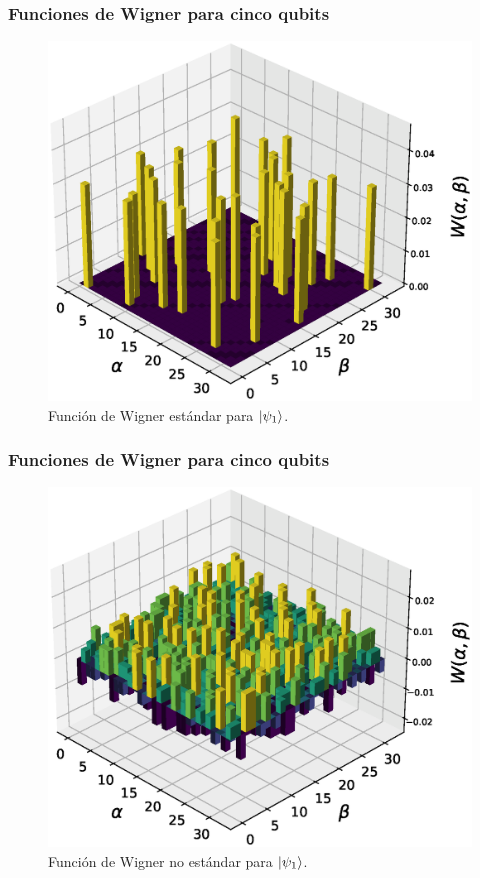 \documentclass[10pt,spanish]{beamer}
\begin{document}
  \begin{frame}
    \frametitle{Funciones de Wigner para cinco qubits}

    \begin{figure}[h]
      \centering
      \includegraphics[scale=0.35]{
        paper/pres_graphs/32_woo.eps
      }
      \caption{
        Función de Wigner estándar para $\ket{\psi_1}$.
      }
      \label{fig:wigner-standard-2-5-s1}
    \end{figure}
  \end{frame}

  \begin{frame}
    \frametitle{Funciones de Wigner para cinco qubits}

    \begin{figure}[h]
      \centering
      \includegraphics[scale=0.35]{
        paper/pres_graphs/32_kan.eps
      }
      \caption{
        Función de Wigner no estándar para $\ket{\psi_1}$.
      }
      \label{fig:wigner-kantor-2-5-s1}
    \end{figure}
  \end{frame}
\end{document}
